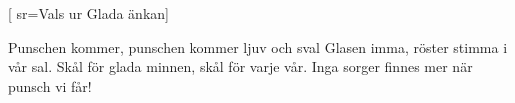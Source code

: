 

[				%
	sr={Vals ur Glada änkan}]						%
	

\beginverse*						%
Punschen kommer,
punschen kommer
ljuv och sval
Glasen imma,
röster stimma
i vår sal.
Skål för glada minnen,
skål för varje vår.
Inga sorger finnes mer när punsch vi får!
\endverse							%

\endsong							%